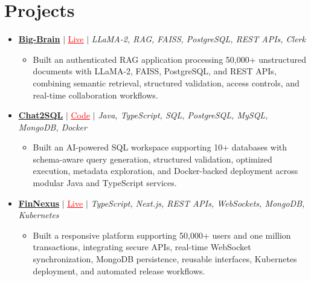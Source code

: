 \documentclass[letterpaper,10pt]{article}
\newcommand{\resumeItem}[1]{\item\small{{#1 \vspace{-2pt}}}}
\newcommand{\resumeProjectHeading}[1]{\item \small #1 \vspace{-2pt}}
\newcommand{\resumeProjectLink}[2]{\href{#1}{\textcolor{red}{\underline{#2}}}}
\newcommand{\resumeSubHeadingListStart}{\begin{itemize}[leftmargin=0.0in,label={}]}
\newcommand{\resumeSubHeadingListEnd}{\end{itemize}}
\newcommand{\resumeProjItemListStart}{\begin{itemize}[leftmargin=0.15in,label=\textbullet,itemsep=0pt,topsep=0pt,parsep=0pt,partopsep=0pt]}
\newcommand{\resumeProjItemListEnd}{\end{itemize}\vspace{1pt}}
\begin{document}
\section{Projects}
\resumeSubHeadingListStart
  \resumeProjectHeading{\href{https://big-brain-pied.vercel.app/}{\textbf{Big-Brain}} $|$ \resumeProjectLink{https://big-brain-pied.vercel.app/}{Live} $|$ \emph{LLaMA-2, RAG, FAISS, PostgreSQL, REST APIs, Clerk}}
  \resumeProjItemListStart
    \resumeItem{Built an authenticated RAG application processing 50,000+ unstructured documents with LLaMA-2, FAISS, PostgreSQL, and REST APIs, combining semantic retrieval, structured validation, access controls, and real-time collaboration workflows.}
  \resumeProjItemListEnd
  \resumeProjectHeading{\href{https://github.com/SAHAJ-BHADJA/Chat2SQL}{\textbf{Chat2SQL}} $|$ \resumeProjectLink{https://github.com/SAHAJ-BHADJA/Chat2SQL}{Code} $|$ \emph{Java, TypeScript, SQL, PostgreSQL, MySQL, MongoDB, Docker}}
  \resumeProjItemListStart
    \resumeItem{Built an AI-powered SQL workspace supporting 10+ databases with schema-aware query generation, structured validation, optimized execution, metadata exploration, and Docker-backed deployment across modular Java and TypeScript services.}
  \resumeProjItemListEnd
  \resumeProjectHeading{\href{https://fin-nexus.vercel.app/}{\textbf{FinNexus}} $|$ \resumeProjectLink{https://fin-nexus.vercel.app/}{Live} $|$ \emph{TypeScript, Next.js, REST APIs, WebSockets, MongoDB, Kubernetes}}
  \resumeProjItemListStart
    \resumeItem{Built a responsive platform supporting 50,000+ users and one million transactions, integrating secure APIs, real-time WebSocket synchronization, MongoDB persistence, reusable interfaces, Kubernetes deployment, and automated release workflows.}
  \resumeProjItemListEnd
\resumeSubHeadingListEnd
\end{document}
